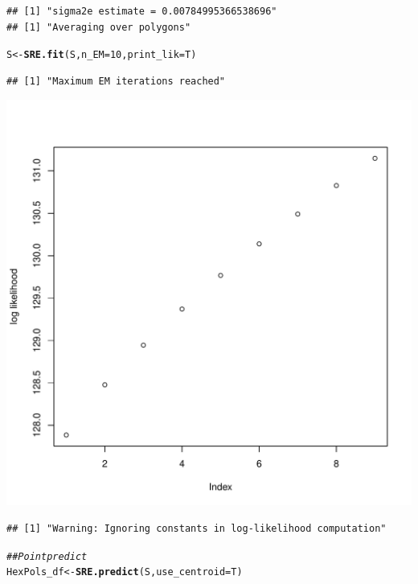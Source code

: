 \documentclass{article}\usepackage[]{graphicx}\usepackage[]{color}
\makeatletter
\def\maxwidth{ %
  \ifdim\Gin@nat@width>\linewidth
    \linewidth
  \else
    \Gin@nat@width
  \fi
}
\newcommand{\hlnum}[1]{\textcolor[rgb]{0.686,0.059,0.569}{#1}}%
\newcommand{\hlcom}[1]{\textcolor[rgb]{0.678,0.584,0.686}{\textit{#1}}}%
\newcommand{\hlstd}[1]{\textcolor[rgb]{0.345,0.345,0.345}{#1}}%
\newcommand{\hlkwb}[1]{\textcolor[rgb]{0.69,0.353,0.396}{#1}}%
\newcommand{\hlkwc}[1]{\textcolor[rgb]{0.333,0.667,0.333}{#1}}%
\newcommand{\hlkwd}[1]{\textcolor[rgb]{0.737,0.353,0.396}{\textbf{#1}}}%
\newenvironment{kframe}{%
 \def\at@end@of@kframe{}%
 \ifinner\ifhmode%
  \def\at@end@of@kframe{\end{minipage}}%
  \begin{minipage}{\columnwidth}%
 \fi\fi%
 \def\FrameCommand##1{\hskip\@totalleftmargin \hskip-\fboxsep
 \colorbox{shadecolor}{##1}\hskip-\fboxsep
     \hskip-\linewidth \hskip-\@totalleftmargin \hskip\columnwidth}%
 \MakeFramed {\advance\hsize-\width
   \@totalleftmargin\z@ \linewidth\hsize
   \@setminipage}}%
 {\par\unskip\endMakeFramed%
 \at@end@of@kframe}
\newenvironment{knitrout}{}{} %
\makeatother
\begin{document}
\begin{knitrout}
\begin{kframe}
{\ttfamily\noindent\color{warningcolor}{\#\# Warning in map\_data\_to\_BAUs(data[[i]], BAUs, av\_var = av\_var, variogram.formula = f, : Not accounting for multiple data in the same grid box during variogram estimation. Need to see how to do this with gstat}}\begin{verbatim}
## [1] "sigma2e estimate = 0.00784995366538696"
## [1] "Averaging over polygons"
\end{verbatim}
\begin{alltt}
\hlstd{S} \hlkwb{<-} \hlkwd{SRE.fit}\hlstd{(S,}\hlkwc{n_EM} \hlstd{=} \hlnum{10}\hlstd{,}\hlkwc{print_lik}\hlstd{=T)}
\end{alltt}
\begin{verbatim}
## [1] "Maximum EM iterations reached"
\end{verbatim}
\end{kframe}
\includegraphics[width=\maxwidth]{figure/unnamed-chunk-1-1} 
\begin{kframe}\begin{verbatim}
## [1] "Warning: Ignoring constants in log-likelihood computation"
\end{verbatim}
\begin{alltt}
\hlcom{## Point predict}
\hlstd{HexPols_df} \hlkwb{<-} \hlkwd{SRE.predict}\hlstd{(S,}\hlkwc{use_centroid} \hlstd{= T)}
\end{alltt}



\end{kframe}
\end{knitrout}
\end{document}
